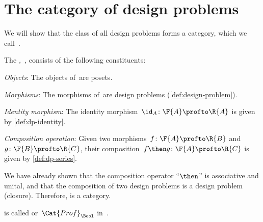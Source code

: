 \section{The category of design problems}

We will show that the class of all design problems forms a category, which we call~\iindex{\DP}.

\begin{definition}
  \label{def:DP}
  The \emph{,~\DP}, consists of the following constituents:
  \begin{compactenum}
    \item \emph{Objects}: The objects of~\DP are posets.
    \item \emph{Morphisms}: The morphisms of~\DP are design problems (\cref{def:design-problem}).
    \item \emph{Identity morphism}: The identity morphism~$\id_A \colon \F{A} \profto \R{A}$ is given by \cref{def:dp-identity}.
    \item \emph{Composition operation}: Given two morphisms~$f \colon  \F{A} \profto \R{B}$ and~$g \colon \F{B} \profto \R{C}$, their
    composition~$f\then g\colon  \F{A} \profto \R{C}$ is
    given by \cref{def:dp-series}.
  \end{compactenum}
\end{definition}

We have already shown that the composition operator ``$\then$'' is associative and unital, and that the composition of two design problems is a design problem (closure). Therefore, \DP is a category.

\begin{remark}
\DP is called \feas or~$\Cat{Prof}_\Bool$ in~\cite{fong2019}.
\end{remark}


